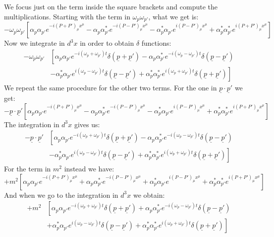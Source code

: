 \documentclass[../main.tex]{subfiles}
\begin{document}
We focus just on the term inside the square brackets and compute the multiplications. Starting with the term in $\omega_p\omega_{p'}$, what we get is:
\[
-\omega_p\omega_{p'}\left[\alpha_p\alpha_{p'}e^{-i(P+P')_\mu x^\mu}-\alpha_p\alpha_{p'}^*e^{-i(P-P')_\mu x^\mu}-\alpha_p^*\alpha_{p'}e^{i(P-P')_\mu x^\mu}+\alpha_p^*\alpha_{p'}^*e^{i(P+P')_\mu x^\mu}\right]
\]
Now we integrate in $d^3x$ in order to obtain $\delta$ functions:
\begin{align*}
-\omega_p\omega_{p'}&\left[\alpha_p\alpha_{p'}e^{-i(\omega_p+\omega_{p'})t}\delta(\underline{p}+\underline{p}')-\alpha_p\alpha_{p'}^*e^{-i(\omega_p-\omega_{p'})t}\delta(\underline{p}-\underline{p}')\right.\\
&\left.-\alpha_p^*\alpha_{p'}e^{i(\omega_p-\omega_{p'})t}\delta(\underline{p}-\underline{p}')+\alpha_p^*\alpha_{p'}^*e^{i(\omega_p+\omega_{p'})t}\delta(\underline{p}+\underline{p}')\right]
\end{align*}
We repeat the same procedure for the other two terms. For the one in $\underline{p}\cdot\underline{p}'$ we get:
\[
-\underline{p}\cdot\underline{p}'\left[\alpha_p\alpha_{p'}e^{-i(P+P')_\mu x^\mu}-\alpha_p\alpha_{p'}^*e^{-i(P-P')_\mu x^\mu}-\alpha_p^*\alpha_{p'}e^{i(P-P')_\mu x^\mu}+\alpha_p^*\alpha_{p'}^*e^{i(P+P')_\mu x^\mu}\right]
\]
The integration in $d^3x$ gives us:
\begin{align*}
-\underline{p}\cdot\underline{p}'&\left[\alpha_p\alpha_{p'}e^{-i(\omega_p+\omega_{p'})t}\delta(\underline{p}+\underline{p}')-\alpha_p\alpha_{p'}^*e^{-i(\omega_p-\omega_{p'})t}\delta(\underline{p}-\underline{p}')\right.\\
&\left.-\alpha_p^*\alpha_{p'}e^{i(\omega_p-\omega_{p'})t}\delta(\underline{p}-\underline{p}')+\alpha_p^*\alpha_{p'}^*e^{i(\omega_p+\omega_{p'})t}\delta(\underline{p}+\underline{p}')\right]
\end{align*}
For the term in $m^2$ instead we have:
\[
+m^2\left[\alpha_p\alpha_{p'}e^{-i(P+P')_\mu x^\mu}+\alpha_p\alpha_{p'}^*e^{-i(P-P')_\mu x^\mu}+\alpha_p^*\alpha_{p'}e^{i(P-P')_\mu x^\mu}+\alpha_p^*\alpha_{p'}^*e^{i(P+P')_\mu x^\mu}\right]\
\]
And when we go to the integration in $d^3x$ we obtain:
\begin{align*}
+m^2&\left[\alpha_p\alpha_{p'}e^{-i(\omega_p+\omega_{p'})t}\delta(\underline{p}+\underline{p}')+\alpha_p\alpha_{p'}^*e^{-i(\omega_p-\omega_{p'})t}\delta(\underline{p}-\underline{p}')\right.\\
&\left.+\alpha_p^*\alpha_{p'}e^{i(\omega_p-\omega_{p'})t}\delta(\underline{p}-\underline{p}')+\alpha_p^*\alpha_{p'}^*e^{i(\omega_p+\omega_{p'})t}\delta(\underline{p}+\underline{p}')\right]
\end{align*}
\end{document}
